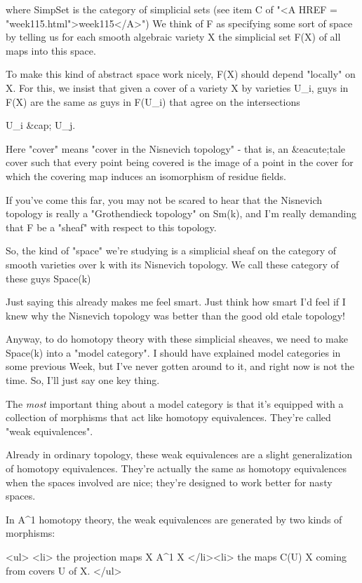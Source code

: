 where SimpSet is the category of simplicial sets (see item C of
"<A HREF = "week115.html">week115</A>") We think of F as
specifying some sort of space by telling us for each smooth algebraic
variety X the simplicial set F(X) of all maps into this space.

To make this kind of abstract space work nicely, F(X) should
depend "locally" on X.  For this, we insist that given a cover 
of a variety X by varieties U_{i}, guys in F(X) are the same as
guys in F(U_{i}) that agree on the intersections 

U_{i} &cap; U_{j}.

Here "cover" means "cover in the Nisnevich
topology" - that is, an &eacute;tale cover such that every point being
covered is the image of a point in the cover for which the covering
map induces an isomorphism of residue fields.

If you've come this far, you may not be scared to hear that the
Nisnevich topology is really a "Grothendieck topology" on Sm(k),
and I'm really demanding that F be a "sheaf" with respect to this
topology.

So, the kind of "space" we're studying is a simplicial sheaf on 
the category of smooth varieties over k with its Nisnevich 
topology.  We call these category of these guys Space(k)

Just saying this already makes me feel smart.  Just think how
smart I'd feel if I knew why the Nisnevich topology was better
than the good old etale topology!

Anyway, to do homotopy theory with these simplicial sheaves, we 
need to make Space(k) into a "model category".  I should have 
explained model categories in some previous Week, but I've never 
gotten around to it, and right now is not the time.  So, I'll 
just say one key thing.

The \emph{most} important thing about a model category is that 
it's equipped with a collection of morphisms that act 
like homotopy equivalences.  They're called "weak equivalences".

Already in ordinary topology, these weak equivalences are a
slight generalization of homotopy equivalences.  They're
actually the same as homotopy equivalences when the spaces
involved are nice; they're designed to work better for nasty 
spaces.

In A^{1} homotopy theory, the weak equivalences are generated
by two kinds of morphisms:

<ul>
<li>
the projection maps X \times  A^{1} \to  X
</li><li>
the maps C(U) \to  X coming from covers U of X.
</ul>

